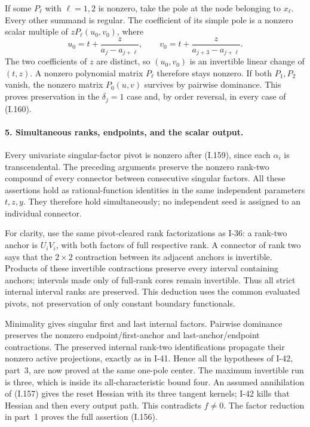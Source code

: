 If some $P_\ell$ with $\ell=1,2$ is nonzero, take the pole
at the node belonging to $x_\ell$. Every other summand is
regular. The coefficient of its simple pole is a nonzero
scalar multiple of $zP_\ell(u_0,v_0)$, where
\[
 u_0=t+\frac{z}{a_j-a_{j+\ell}},\qquad
 v_0=t+\frac{z}{a_{j+3}-a_{j+\ell}}.
 \tag{I.171}
\]
The two coefficients of $z$ are distinct, so $(u_0,v_0)$
is an invertible linear change of $(t,z)$. A nonzero
polynomial matrix $P_\ell$ therefore stays nonzero. If both
$P_1,P_2$ vanish, the nonzero matrix $P_0(u,v)$ survives by
pairwise dominance. This proves preservation in the
$\delta_j=1$ case and, by order reversal, in every case of
(I.160).

\paragraph{5. Simultaneous ranks, endpoints, and the scalar output.}
Every univariate singular-factor pivot is nonzero after
(I.159), since each $\alpha_i$ is transcendental. The
preceding arguments preserve the nonzero rank-two compound
of every connector between consecutive singular factors.
All these assertions hold as rational-function identities
in the same independent parameters $t,z,y$. They therefore
hold simultaneously; no independent seed is assigned to an
individual connector.

For clarity, use the same pivot-cleared rank factorizations
as I-36: a rank-two anchor is $U_iV_i$, with both factors
of full respective rank. A connector of rank two says that
the $2\times2$ contraction between its adjacent anchors is
invertible. Products of these invertible contractions
preserve every interval containing anchors; intervals made
only of full-rank cores remain invertible. Thus all strict
internal interval ranks are preserved. This deduction uses
the common evaluated pivots, not preservation of only
constant boundary functionals.

Minimality gives singular first and last internal factors.
Pairwise dominance preserves the nonzero endpoint/first-anchor
and last-anchor/endpoint contractions. The preserved internal
rank-two identifications propagate their nonzero active
projections, exactly as in I-41. Hence all the hypotheses of
I-42, part~3, are now proved at the same one-pole center.
The maximum invertible run is three, which is inside its
all-characteristic bound four. An assumed annihilation of
(I.157) gives the reset Hessian with its three tangent kernels;
I-42 kills that Hessian and then every output path. This
contradicts $f\ne0$. The factor reduction in part~1 proves
the full assertion (I.156).

